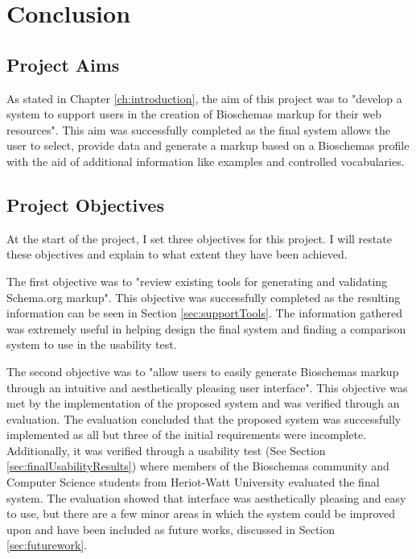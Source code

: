 {
\chapter{Conclusion}
}
{
\section{Project Aims}
As stated in Chapter \ref{ch:introduction}, the aim of this project was to "develop a system to support users in the creation of Bioschemas markup for their web resources". This aim was successfully completed as the final system allows the user to select, provide data and generate a markup based on a Bioschemas profile with the aid of additional information like examples and controlled vocabularies.

\section{Project Objectives}
At the start of the project, I set three objectives for this project. I will restate these objectives and explain to what extent they have been achieved.

The first objective was to "review existing tools for generating and validating Schema.org markup". This objective was successfully completed as the resulting information can be seen in Section \ref{sec:supportTools}. The information gathered was extremely useful in helping design the final system and finding a comparison system to use in the usability test.

The second objective was to "allow users to easily generate Bioschemas markup through an intuitive and aesthetically pleasing user interface". This objective was met by the implementation of the proposed system and was verified through an evaluation. The evaluation concluded that the proposed system was successfully implemented as all but three of the initial requirements were incomplete. Additionally, it was verified through a usability test (See Section \ref{sec:finalUsabilityResults}) where members of the Bioschemas community and Computer Science students from Heriot-Watt University evaluated the final system. The evaluation showed that interface was aesthetically pleasing and easy to use, but there are a few minor areas in which the system could be improved upon and have been included as future works, discussed in Section \ref{sec:futurework}.

}
